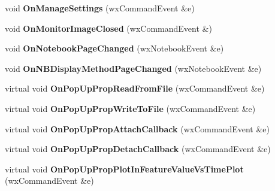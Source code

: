 \begin{DoxyCompactItemize}
\item 
\hypertarget{class_prop_view_frame_ac2176e3e920c6e30861fa269e7882c62}{void {\bfseries On\+Manage\+Settings} (wx\+Command\+Event \&e)}\label{class_prop_view_frame_ac2176e3e920c6e30861fa269e7882c62}

\item 
\hypertarget{class_prop_view_frame_a58a6c64d69b4229e7bdc44c60f3a4270}{void {\bfseries On\+Monitor\+Image\+Closed} (wx\+Command\+Event \&)}\label{class_prop_view_frame_a58a6c64d69b4229e7bdc44c60f3a4270}

\item 
\hypertarget{class_prop_view_frame_a9b3b5eda144c4ebcb0d58814eefee89c}{void {\bfseries On\+Notebook\+Page\+Changed} (wx\+Notebook\+Event \&e)}\label{class_prop_view_frame_a9b3b5eda144c4ebcb0d58814eefee89c}

\item 
\hypertarget{class_prop_view_frame_acb77908cd95bafc0b1ddaa018927f233}{void {\bfseries On\+N\+B\+Display\+Method\+Page\+Changed} (wx\+Notebook\+Event \&e)}\label{class_prop_view_frame_acb77908cd95bafc0b1ddaa018927f233}

\item 
\hypertarget{class_prop_view_frame_a854fbec9aada37dd17545006591a7990}{virtual void {\bfseries On\+Pop\+Up\+Prop\+Read\+From\+File} (wx\+Command\+Event \&e)}\label{class_prop_view_frame_a854fbec9aada37dd17545006591a7990}

\item 
\hypertarget{class_prop_view_frame_ab4e51d1367ec0f879c21274925f3bc9b}{virtual void {\bfseries On\+Pop\+Up\+Prop\+Write\+To\+File} (wx\+Command\+Event \&e)}\label{class_prop_view_frame_ab4e51d1367ec0f879c21274925f3bc9b}

\item 
\hypertarget{class_prop_view_frame_a6704a436e9449f38e3f14f8f2ceebc8e}{virtual void {\bfseries On\+Pop\+Up\+Prop\+Attach\+Callback} (wx\+Command\+Event \&e)}\label{class_prop_view_frame_a6704a436e9449f38e3f14f8f2ceebc8e}

\item 
\hypertarget{class_prop_view_frame_a707ad570b277543bef20d090ee58426a}{virtual void {\bfseries On\+Pop\+Up\+Prop\+Detach\+Callback} (wx\+Command\+Event \&e)}\label{class_prop_view_frame_a707ad570b277543bef20d090ee58426a}

\item 
\hypertarget{class_prop_view_frame_a131d6882ab8fa2fde0d2d1e526690ea3}{virtual void {\bfseries On\+Pop\+Up\+Prop\+Plot\+In\+Feature\+Value\+Vs\+Time\+Plot} (wx\+Command\+Event \&e)}\label{class_prop_view_frame_a131d6882ab8fa2fde0d2d1e526690ea3}


\end{DoxyCompactItemize}
